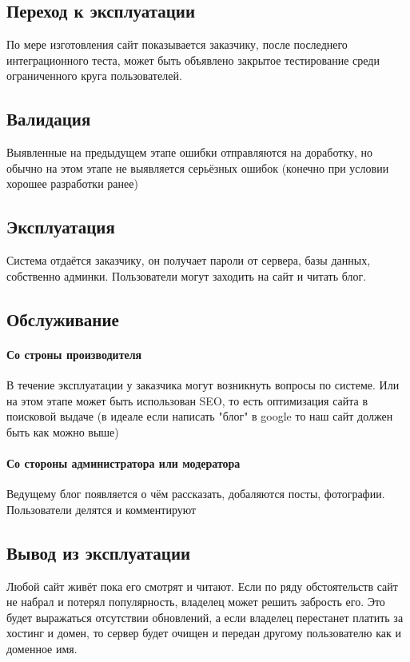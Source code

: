 \documentclass[bibliography=totocnumbered]{scrartcl}
\begin{document}
\subsection{Переход к эксплуатации}
По мере изготовления сайт показывается заказчику, после последнего интеграционного теста, может быть объявлено закрытое тестирование среди ограниченного круга пользователей.

\subsection{Валидация}
Выявленные на предыдущем этапе ошибки отправляются на доработку, но обычно на этом этапе не выявляется серьёзных ошибок (конечно при условии хорошее разработки ранее)

\subsection{Эксплуатация}
Система отдаётся заказчику, он получает пароли от сервера, базы данных, собственно админки. Пользователи могут заходить на сайт и читать блог.

\subsection{Обслуживание}

\paragraph{Со строны производителя}
В течение эксплуатации у заказчика могут возникнуть вопросы по системе. Или на этом этапе может быть использован SEO, то есть оптимизация сайта в поисковой выдаче (в идеале если написать "блог" в google то наш сайт должен быть как можно выше)

\paragraph{Со стороны администратора или модератора}
Ведущему блог появляется о чём рассказать, добаляются посты, фотографии. Пользователи делятся и комментируют

\subsection{Вывод из эксплуатации}

Любой сайт живёт пока его смотрят и читают. Если по ряду обстоятельств сайт не набрал и потерял популярность, владелец может решить забрость его. Это будет выражаться отсутствии обновлений, а если владелец перестанет платить за хостинг и домен, то сервер будет очищен и передан другому пользователю как и доменное имя.
\end{document}
